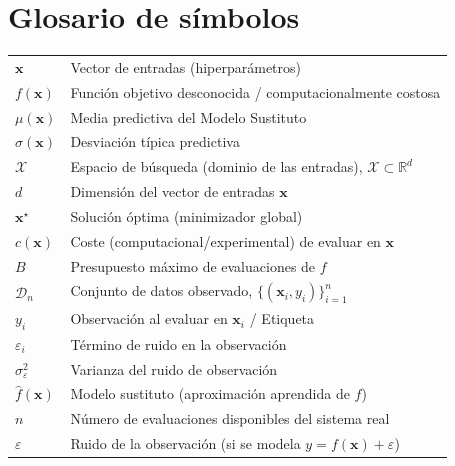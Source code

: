 \chapter*{Glosario de símbolos}

\begin{tabular}{ll}
$\bm{x}$ & Vector de entradas (hiperparámetros) \\
$f(\bm{x})$ & Función objetivo desconocida / computacionalmente costosa \\
$\mu(\bm{x})$ & Media predictiva del Modelo Sustituto \\
$\sigma(\bm{x})$ & Desviación típica predictiva \\

$\mathcal{X}$ & Espacio de búsqueda (dominio de las entradas), $\mathcal{X}\subset\mathbb{R}^{d}$ \\
$d$ & Dimensión del vector de entradas $\bm{x}$ \\
$\bm{x}^\star$ & Solución óptima (minimizador global) \\
$c(\bm{x})$ & Coste (computacional/experimental) de evaluar en $\bm{x}$ \\
$B$ & Presupuesto máximo de evaluaciones de $f$ \\
$\mathcal{D}_n$ & Conjunto de datos observado, $\{(\bm{x}_i,y_i)\}_{i=1}^{n}$ \\
$y_i$ & Observación al evaluar en $\bm{x}_i$ / Etiqueta \\
$\varepsilon_i$ & Término de ruido en la observación \\
$\sigma_\varepsilon^2$ & Varianza del ruido de observación \\
$\hat{f}(\bm{x})$ & Modelo sustituto (aproximación aprendida de $f$) \\
$n$ & Número de evaluaciones disponibles del sistema real \\
$\varepsilon$ & Ruido de la observación (si se modela $y=f(\bm{x})+\varepsilon$) \\


\end{tabular}
